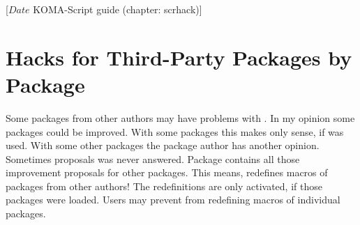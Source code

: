%
%
%
%
%
%
%
%
% 
%
%
%
%

                 [$Date$
                  KOMA-Script guide (chapter: scrhack)]

\chapter{Hacks for Third-Party Packages by Package }

Some packages from other authors may have problems with \KOMAScript{}.  In my
opinion some packages could be improved. With some packages this makes only
sense, if \KOMAScript{} was used. With some other packages the package author
has another opinion. Sometimes proposals was never answered. Package
 contains all those improvement proposals for other
packages. This means,  redefines macros of packages from
other authors! The redefinitions are only activated, if those packages were
loaded. Users may prevent  from redefining macros of
individual packages.

